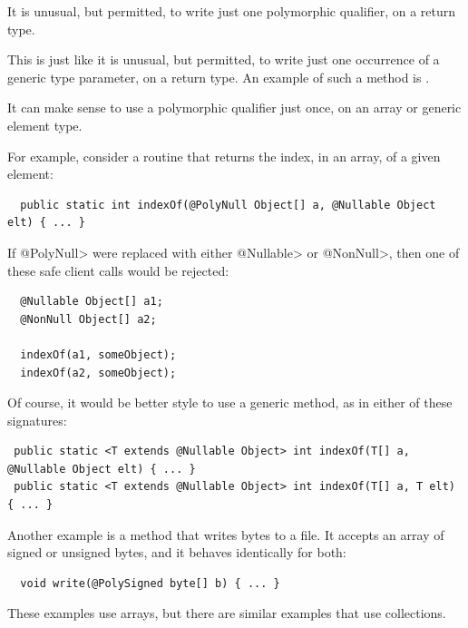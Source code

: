 
It is unusual, but permitted, to write just one polymorphic qualifier, on a return type.

This is just like it is unusual, but permitted, to write just one
occurrence of a generic type parameter, on a return type.  An example of
such a method is
.



It can make sense to use a polymorphic qualifier just once, on an array or
generic element type.

For example, consider a routine that returns the index, in an array, of a
given element:

\begin{Verbatim}
  public static int indexOf(@PolyNull Object[] a, @Nullable Object elt) { ... }
\end{Verbatim}

If \<@PolyNull> were replaced with either \<@Nullable> or \<@NonNull>, then
one of these safe client calls would be rejected:

\begin{Verbatim}
  @Nullable Object[] a1;
  @NonNull Object[] a2;

  indexOf(a1, someObject);
  indexOf(a2, someObject);
\end{Verbatim}

Of course, it would be better style to use a generic method, as in either
of these signatures:

\begin{Verbatim}
 public static <T extends @Nullable Object> int indexOf(T[] a, @Nullable Object elt) { ... }
 public static <T extends @Nullable Object> int indexOf(T[] a, T elt) { ... }
\end{Verbatim}


Another example is a method that writes bytes to a file.  It accepts an
array of signed or unsigned bytes, and it behaves identically for both:

\begin{Verbatim}
  void write(@PolySigned byte[] b) { ... }
\end{Verbatim}


These examples use arrays, but there are similar examples that
use collections.


